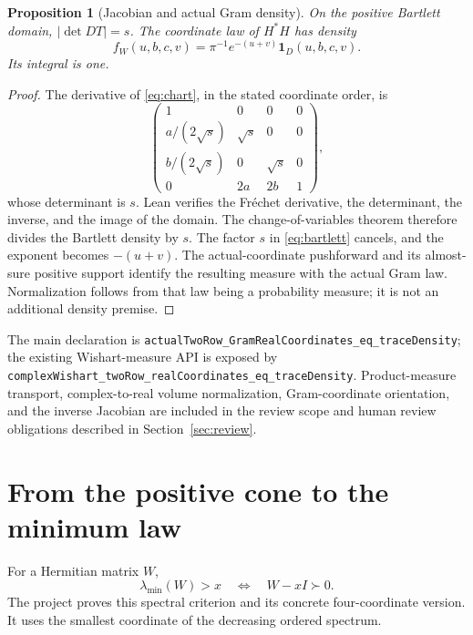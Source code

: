 \documentclass[11pt]{article}
\newtheorem{proposition}[theorem]{Proposition}
\newcommand{\pd}{\succ0}
\newcommand{\lean}[1]{{\small\nolinkurl{#1}}}
\begin{document}
\begin{proposition}[Jacobian and actual Gram density]\label{thm:gram}
On the positive Bartlett domain, $|\det DT|=s$. The coordinate law of $H^*H$
has density
\begin{equation}\label{eq:gram}
 f_W(u,b,c,v)=\pi^{-1}e^{-(u+v)}\mathbf1_D(u,b,c,v).
\end{equation}
Its integral is one.
\end{proposition}
\begin{proof}
The derivative of \eqref{eq:chart}, in the stated coordinate order, is
\[
 \begin{pmatrix}
 1&0&0&0\\
 a/(2\sqrt s)&\sqrt s&0&0\\
 b/(2\sqrt s)&0&\sqrt s&0\\
 0&2a&2b&1
 \end{pmatrix},
\]
whose determinant is $s$. Lean verifies the Fr\'echet derivative, the determinant,
the inverse, and the image of the domain. The change-of-variables theorem
therefore divides the Bartlett density by $s$. The factor $s$ in
\eqref{eq:bartlett} cancels, and the exponent becomes $-(u+v)$.
The actual-coordinate pushforward and its almost-sure positive support identify
the resulting measure with the actual Gram law. Normalization follows from
that law being a probability measure; it is not an additional density premise.
\end{proof}

The main declaration is
\lean{actualTwoRow_GramRealCoordinates_eq_traceDensity}; the existing
Wishart-measure API is exposed by
\lean{complexWishart_twoRow_realCoordinates_eq_traceDensity}.
Product-measure transport, complex-to-real volume normalization, Gram-coordinate
orientation, and the inverse Jacobian are included in the review scope
and human review obligations described in Section~\ref{sec:review}.

\section{From the positive cone to the minimum law}\label{sec:minimum}
For a Hermitian matrix $W$,
\begin{equation}\label{eq:threshold}
 \lambda_{\min}(W)>x\quad\Longleftrightarrow\quad W-xI\pd.
\end{equation}
The project proves this spectral criterion and its concrete four-coordinate
version. It uses the smallest coordinate of the decreasing ordered spectrum.
\end{document}
